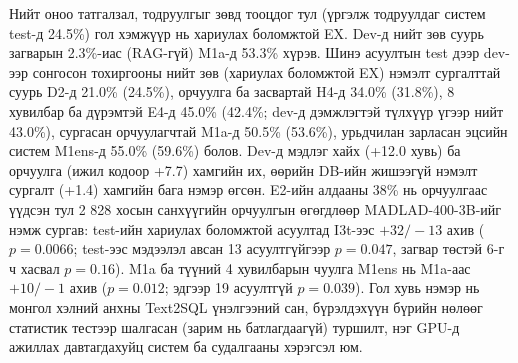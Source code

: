 Нийт оноо татгалзал, тодруулгыг зөвд тооцдог тул (үргэлж тодруулдаг систем test-д 24.5\%) гол хэмжүүр нь хариулах
боломжтой EX. Dev-д нийт зөв суурь загварын 2.3\%-иас (RAG-гүй) M1a-д 53.3\% хүрэв. Шинэ асуултын test дээр dev-ээр
сонгосон тохиргооны нийт зөв (хариулах боломжтой EX) нэмэлт сургалттай суурь D2-д 21.0\% (24.5\%), орчуулга ба
засвартай H4-д 34.0\% (31.8\%), 8 хувилбар ба дүрэмтэй E4-д 45.0\% (42.4\%; dev-д дэмжлэгтэй түлхүүр үгээр нийт 43.0\%),
сургасан орчуулагчтай M1a-д 50.5\% (53.6\%), урьдчилан зарласан эцсийн систем M1ens-д 55.0\% (59.6\%) болов. Dev-д
мэдлэг хайх (+12.0 хувь) ба орчуулга (ижил кодоор +7.7) хамгийн их, өөрийн DB-ийн жишээгүй нэмэлт сургалт (+1.4) хамгийн
бага нэмэр өгсөн. E2-ийн алдааны 38\% нь орчуулгаас үүдсэн тул 2 828 хосын санхүүгийн орчуулгын өгөгдлөөр
MADLAD-400-3B-ийг нэмж сургав: test-ийн хариулах боломжтой асуултад I3t-ээс $+32/-13$ ахив ($p = 0.0066$; test-ээс
мэдээлэл авсан 13 асуултгүйгээр $p = 0.047$, загвар төстэй 6-г ч хасвал $p = 0.16$). M1a ба түүний 4 хувилбарын чуулга
M1ens нь M1a-аас $+10/-1$ ахив ($p = 0.012$; эдгээр 19 асуултгүй $p = 0.039$). Гол хувь нэмэр нь монгол хэлний
анхны Text2SQL үнэлгээний сан, бүрэлдэхүүн бүрийн нөлөөг статистик тестээр шалгасан (зарим нь батлагдаагүй)
туршилт, нэг GPU-д ажиллах давтагдахуйц систем ба судалгааны хэрэгсэл юм.
